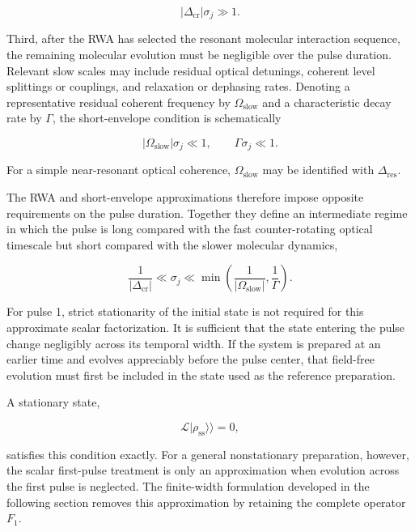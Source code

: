 \documentclass[11pt]{article}
\begin{document}
\begin{equation}
\boxed{
|\Delta_{\mathrm{cr}}|\sigma_j
\gg
1.
}
\label{eq:rwa_validity}
\end{equation}

Third, after the RWA has selected the resonant molecular interaction
sequence, the remaining molecular evolution must be negligible over
the pulse duration. Relevant slow scales may include residual optical
detunings, coherent level splittings or couplings, and relaxation or
dephasing rates. Denoting a representative residual coherent frequency
by $\Omega_{\mathrm{slow}}$ and a characteristic decay rate by
$\Gamma$, the short-envelope condition is schematically

\begin{equation}
\boxed{
|\Omega_{\mathrm{slow}}|\sigma_j
\ll
1,
\qquad
\Gamma\sigma_j
\ll
1.
}
\label{eq:short_envelope_validity}
\end{equation}

For a simple near-resonant optical coherence,
$\Omega_{\mathrm{slow}}$ may be identified with
$\Delta_{\mathrm{res}}$.

The RWA and short-envelope approximations therefore impose opposite
requirements on the pulse duration. Together they define an
intermediate regime in which the pulse is long compared with the fast
counter-rotating optical timescale but short compared with the slower
molecular dynamics,

\begin{equation}
\boxed{
\frac{1}{|\Delta_{\mathrm{cr}}|}
\ll
\sigma_j
\ll
\min
\left(
\frac{1}{|\Omega_{\mathrm{slow}}|},
\frac{1}{\Gamma}
\right).
}
\label{eq:short_pulse_window}
\end{equation}

For pulse 1, strict stationarity of the initial state is not required
for this approximate scalar factorization. It is sufficient that the
state entering the pulse change negligibly across its temporal width.
If the system is prepared at an earlier time and evolves appreciably
before the pulse center, that field-free evolution must first be
included in the state used as the reference preparation.

A stationary state,

\begin{equation}
\mathcal{L}|\rho_{\mathrm{ss}}\rangle\rangle=0,
\end{equation}

satisfies this condition exactly. For a general nonstationary
preparation, however, the scalar first-pulse treatment is only an
approximation when evolution across the first pulse is neglected. The
finite-width formulation developed in the following section removes
this approximation by retaining the complete operator $F_1$.
\end{document}
